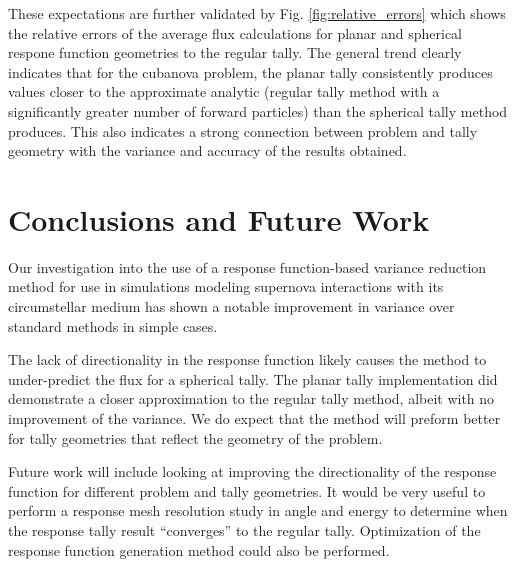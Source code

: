 \documentclass[]{article}
\begin{document}
		These expectations are further validated by Fig. \ref{fig:relative_errors} which shows the relative errors of the average flux calculations for planar and spherical respone function geometries to the regular tally. The general trend clearly indicates that for the cubanova problem, the planar tally consistently produces values closer to the approximate analytic (regular tally method with a significantly greater number of forward particles) than the spherical tally method produces. This also indicates a strong connection between problem and tally geometry with the variance and accuracy of the results obtained. 

\section{Conclusions and Future Work}
Our investigation into the use of a response function-based variance reduction method for use in simulations modeling supernova interactions with its circumstellar medium has shown a notable improvement in variance over standard methods in simple cases. 

The lack of directionality in the response function likely causes the method to under-predict the flux for a spherical tally. The planar tally implementation did demonstrate a closer approximation to the regular tally method, albeit with no improvement of the variance. We do expect that the method will preform better for tally geometries that reflect the geometry of the problem.

Future work will include looking at improving the directionality of the response function for different problem and tally geometries. It would be very useful to perform a response mesh resolution study in angle and energy to determine when the response tally result ``converges'' to the regular tally. Optimization of the response function generation method could also be performed.

\newpage
\end{document}

